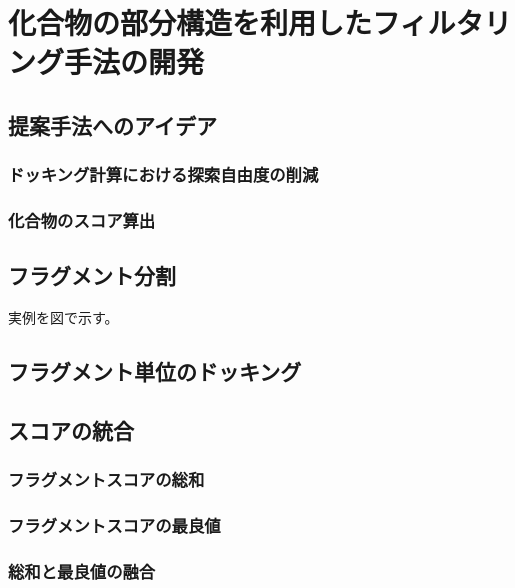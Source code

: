 \chapter{化合物の部分構造を利用したフィルタリング手法の開発}


\section{提案手法へのアイデア}
\subsection{ドッキング計算における探索自由度の削減}
\subsection{化合物のスコア算出}

\section{フラグメント分割}
実例を図で示す。

\section{フラグメント単位のドッキング}

\section{スコアの統合}
\subsection{フラグメントスコアの総和}
\subsection{フラグメントスコアの最良値}
\subsection{総和と最良値の融合}